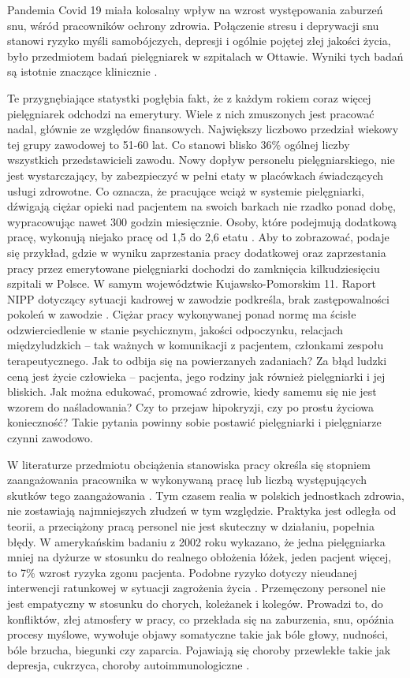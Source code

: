 \documentclass[a4paper,12pt,twoside,openright]{mwrep}
\begin{document}
Pandemia Covid 19 miała kolosalny wpływ na wzrost występowania zaburzeń snu, wśród pracowników ochrony zdrowia. Połączenie stresu i deprywacji snu stanowi ryzyko myśli samobójczych, depresji i ogólnie pojętej złej jakości życia, było przedmiotem badań pielęgniarek w szpitalach w Ottawie. Wyniki tych badań są istotnie znaczące klinicznie \cite{sen}.

Te przygnębiające statystki pogłębia fakt, że z każdym rokiem coraz więcej pielęgniarek odchodzi na emerytury. Wiele z nich zmuszonych jest pracować nadal, głównie ze względów finansowych.  Największy liczbowo przedział wiekowy tej grupy zawodowej to 51-60 lat. Co stanowi blisko 36\% ogólnej liczby wszystkich przedstawicieli zawodu. Nowy dopływ personelu pielęgniarskiego, nie jest wystarczający, by zabezpieczyć w pełni etaty w placówkach świadczących usługi zdrowotne. Co oznacza, że pracujące wciąż w systemie pielęgniarki, dźwigają ciężar opieki nad pacjentem na swoich barkach nie rzadko ponad dobę, wypracowując nawet 300 godzin miesięcznie. Osoby, które podejmują dodatkową pracę, wykonują niejako pracę od 1,5 do 2,6 etatu \cite{cyfrowe}. Aby to zobrazować, podaje się przykład, gdzie w wyniku zaprzestania pracy dodatkowej oraz zaprzestania pracy przez emerytowane pielęgniarki dochodzi do zamknięcia kilkudziesięciu szpitali w Polsce. W samym województwie Kujawsko-Pomorskim 11. Raport NIPP dotyczący sytuacji kadrowej w zawodzie podkreśla, brak zastępowalności pokoleń w zawodzie \cite{statystyka}. Ciężar pracy wykonywanej ponad normę ma ścisłe odzwierciedlenie w  stanie psychicznym, jakości  odpoczynku, relacjach międzyludzkich – tak ważnych w komunikacji z pacjentem, członkami zespołu terapeutycznego. Jak to odbija się na powierzanych zadaniach? Za błąd ludzki ceną jest życie człowieka – pacjenta, jego rodziny jak również pielęgniarki i jej bliskich. Jak można edukować, promować zdrowie, kiedy samemu się nie jest wzorem do naśladowania? Czy to przejaw hipokryzji, czy po prostu życiowa konieczność? Takie pytania powinny sobie postawić pielęgniarki i pielęgniarze czynni zawodowo.

W literaturze przedmiotu obciążenia stanowiska pracy określa się stopniem zaangażowania pracownika w wykonywaną pracę lub liczbą występujących skutków tego zaangażowania \cite{stanowisko}. Tym czasem realia w polskich jednostkach zdrowia, nie zostawiają najmniejszych złudzeń w tym względzie. Praktyka jest odległa od teorii, a przeciążony pracą personel nie jest skuteczny w działaniu, popełnia błędy. W amerykańskim badaniu z 2002 roku wykazano, że jedna pielęgniarka mniej na dyżurze w stosunku do realnego obłożenia łóżek, jeden pacjent więcej, to 7\% wzrost ryzyka zgonu pacjenta. Podobne ryzyko dotyczy nieudanej interwencji ratunkowej w sytuacji zagrożenia życia \cite{rko}. Przemęczony personel nie jest empatyczny w stosunku do chorych, koleżanek i kolegów. Prowadzi to, do konfliktów, złej atmosfery w pracy, co przekłada się na zaburzenia, snu, opóźnia procesy myślowe, wywołuje objawy somatyczne takie jak bóle głowy, nudności, bóle brzucha, biegunki czy zaparcia. Pojawiają się choroby przewlekłe takie jak depresja, cukrzyca, choroby autoimmunologiczne \cite{zdrowie}.
\end{document}
